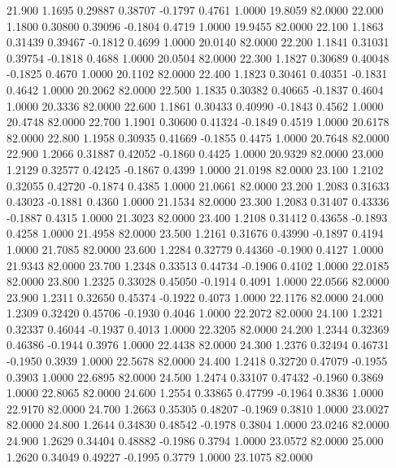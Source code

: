   21.900   1.1695   0.29887   0.38707  -0.1797   0.4761   1.0000  19.8059  82.0000
  22.000   1.1800   0.30800   0.39096  -0.1804   0.4719   1.0000  19.9455  82.0000
  22.100   1.1863   0.31439   0.39467  -0.1812   0.4699   1.0000  20.0140  82.0000
  22.200   1.1841   0.31031   0.39754  -0.1818   0.4688   1.0000  20.0504  82.0000
  22.300   1.1827   0.30689   0.40048  -0.1825   0.4670   1.0000  20.1102  82.0000
  22.400   1.1823   0.30461   0.40351  -0.1831   0.4642   1.0000  20.2062  82.0000
  22.500   1.1835   0.30382   0.40665  -0.1837   0.4604   1.0000  20.3336  82.0000
  22.600   1.1861   0.30433   0.40990  -0.1843   0.4562   1.0000  20.4748  82.0000
  22.700   1.1901   0.30600   0.41324  -0.1849   0.4519   1.0000  20.6178  82.0000
  22.800   1.1958   0.30935   0.41669  -0.1855   0.4475   1.0000  20.7648  82.0000
  22.900   1.2066   0.31887   0.42052  -0.1860   0.4425   1.0000  20.9329  82.0000
  23.000   1.2129   0.32577   0.42425  -0.1867   0.4399   1.0000  21.0198  82.0000
  23.100   1.2102   0.32055   0.42720  -0.1874   0.4385   1.0000  21.0661  82.0000
  23.200   1.2083   0.31633   0.43023  -0.1881   0.4360   1.0000  21.1534  82.0000
  23.300   1.2083   0.31407   0.43336  -0.1887   0.4315   1.0000  21.3023  82.0000
  23.400   1.2108   0.31412   0.43658  -0.1893   0.4258   1.0000  21.4958  82.0000
  23.500   1.2161   0.31676   0.43990  -0.1897   0.4194   1.0000  21.7085  82.0000
  23.600   1.2284   0.32779   0.44360  -0.1900   0.4127   1.0000  21.9343  82.0000
  23.700   1.2348   0.33513   0.44734  -0.1906   0.4102   1.0000  22.0185  82.0000
  23.800   1.2325   0.33028   0.45050  -0.1914   0.4091   1.0000  22.0566  82.0000
  23.900   1.2311   0.32650   0.45374  -0.1922   0.4073   1.0000  22.1176  82.0000
  24.000   1.2309   0.32420   0.45706  -0.1930   0.4046   1.0000  22.2072  82.0000
  24.100   1.2321   0.32337   0.46044  -0.1937   0.4013   1.0000  22.3205  82.0000
  24.200   1.2344   0.32369   0.46386  -0.1944   0.3976   1.0000  22.4438  82.0000
  24.300   1.2376   0.32494   0.46731  -0.1950   0.3939   1.0000  22.5678  82.0000
  24.400   1.2418   0.32720   0.47079  -0.1955   0.3903   1.0000  22.6895  82.0000
  24.500   1.2474   0.33107   0.47432  -0.1960   0.3869   1.0000  22.8065  82.0000
  24.600   1.2554   0.33865   0.47799  -0.1964   0.3836   1.0000  22.9170  82.0000
  24.700   1.2663   0.35305   0.48207  -0.1969   0.3810   1.0000  23.0027  82.0000
  24.800   1.2644   0.34830   0.48542  -0.1978   0.3804   1.0000  23.0246  82.0000
  24.900   1.2629   0.34404   0.48882  -0.1986   0.3794   1.0000  23.0572  82.0000
  25.000   1.2620   0.34049   0.49227  -0.1995   0.3779   1.0000  23.1075  82.0000
